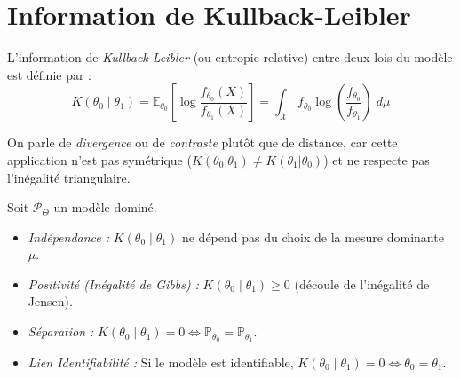 
\section{Information de Kullback-Leibler}

\begin{definition}
    L'information de \emph{Kullback-Leibler} (ou entropie relative) entre deux lois du modèle est définie par : 
    \begin{equation}
        K( \theta_0 \mid \theta_1) = \mathbb{E}_{\theta_0} \left[\log \frac{f_{\theta_0}(X)}{f_{\theta_1}(X)} \right] = 
        \int_\mathcal{X} f_{\theta_0} \log \left( \frac{f_{\theta_0}}{f_{\theta_1}}\right) \; d \mu 
    \end{equation}
\end{definition}

On parle de \emph{divergence} ou de \emph{contraste} plutôt que de distance, car cette application n'est pas 
symétrique ($K(\theta_0|\theta_1) \neq K(\theta_1|\theta_0)$) et ne respecte pas l'inégalité triangulaire.

\begin{proposition}
    Soit $\mathcal{P}_\Theta$ un modèle dominé.
    \begin{itemize}
        \item \emph{Indépendance :} $K( \theta_0 \mid \theta_1)$ ne dépend pas du choix de la mesure dominante $\mu$. 
        \item \emph{Positivité (Inégalité de Gibbs) :} $ K( \theta_0 \mid \theta_1) \geqslant 0$ (découle de l'inégalité de Jensen).
        \item \emph{Séparation :} $ K( \theta_0 \mid \theta_1) = 0 \iff \mathbb{P}_{\theta_0} = \mathbb{P}_{\theta_1}$. 
        \item \emph{Lien Identifiabilité :} Si le modèle est identifiable, $K( \theta_0 \mid \theta_1) = 0 \iff \theta_0 = \theta_1$.
    \end{itemize}
\end{proposition}



